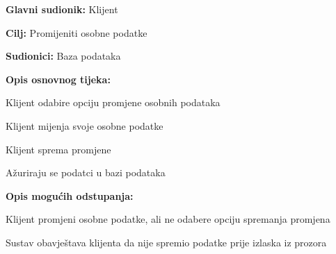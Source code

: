 					\noindent {}
					\begin{packed_item}
	
						\item \textbf{Glavni sudionik: }Klijent
						\item  \textbf{Cilj:} Promijeniti osobne podatke
						\item  \textbf{Sudionici:} Baza podataka
						\item  \textbf{Opis osnovnog tijeka:}
						
						\item[] \begin{packed_enum}
	
							\item Klijent odabire opciju promjene osobnih podataka
							\item Klijent mijenja svoje osobne podatke
							\item Klijent sprema promjene
							\item Ažuriraju se podatci u bazi podataka
						\end{packed_enum}
						
						\item  \textbf{Opis mogućih odstupanja:}
						
						\item[] \begin{packed_item}
	
							\item[2.a] Klijent promjeni osobne podatke, ali ne odabere opciju spremanja promjena
							\item[] \begin{packed_enum}
								
								\item Sustav obavještava klijenta da nije spremio podatke prije izlaska iz prozora
								
							\end{packed_enum}
							
						\end{packed_item}
					\end{packed_item}

